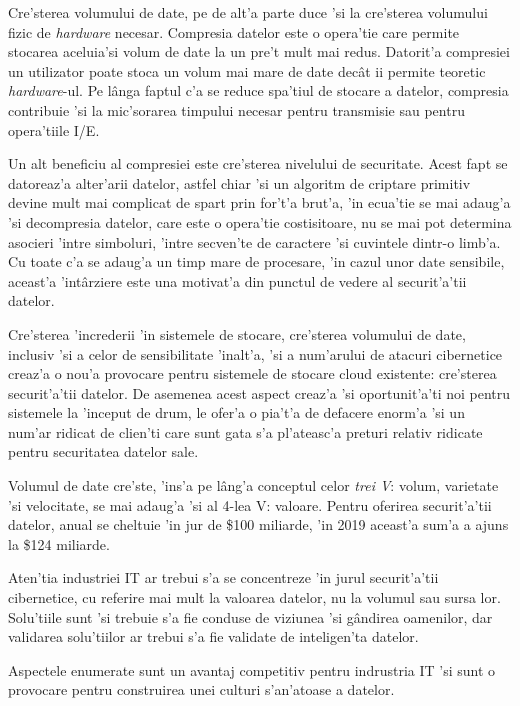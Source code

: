 \documentclass[12pt,a4paper,twoside]{report}
\begin{document}
Cre'sterea volumului de date, pe de alt'a parte duce 'si la cre'sterea volumului fizic de \textit{hardware} necesar. Compresia datelor este o opera'tie care permite stocarea aceluia'si volum de date la un pre't mult mai redus\cite{data_compression_ibm}. Datorit'a compresiei un utilizator poate stoca un volum mai mare de date decât ii permite teoretic \textit{hardware}-ul. Pe lânga faptul c'a se reduce spa'tiul de stocare a datelor, compresia contribuie 'si la mic'sorarea timpului necesar pentru transmisie sau pentru opera'tiile I/E\cite{compression_adv}. 

Un alt beneficiu al compresiei este cre'sterea nivelului de securitate. Acest fapt se datoreaz'a alter'arii datelor, astfel chiar 'si un algoritm de criptare primitiv devine mult mai complicat de spart prin for't'a brut'a, 'in ecua'tie se mai adaug'a 'si decompresia datelor, care este o opera'tie costisitoare, nu se mai pot determina asocieri 'intre simboluri, 'intre secven'te de caractere 'si cuvintele dintr-o limb'a. Cu toate c'a se adaug'a un timp mare de procesare, 'in cazul unor date sensibile, aceast'a 'intârziere este una motivat'a din punctul de vedere al securit'a'tii datelor.

Cre'sterea 'increderii 'in sistemele de stocare, cre'sterea volumului de date, inclusiv 'si a celor de sensibilitate 'inalt'a, 'si  a num'arului de atacuri cibernetice creaz'a o nou'a provocare pentru sistemele de stocare cloud existente: cre'sterea securit'a'tii datelor. De asemenea acest aspect creaz'a 'si oportunit'a'ti noi pentru sistemele la 'inceput de drum, le ofer'a o pia't'a de defacere enorm'a 'si un num'ar ridicat de clien'ti care sunt gata s'a pl'ateasc'a preturi relativ ridicate pentru securitatea datelor sale.

Volumul de date cre'ste, 'ins'a pe lâng'a conceptul celor \textit{trei V}: volum, varietate 'si velocitate, se mai adaug'a 'si al 4-lea V: valoare. Pentru oferirea securit'a'tii datelor, anual se cheltuie 'in jur de \$100 miliarde, 'in 2019 aceast'a sum'a a ajuns la \$124 miliarde.

Aten'tia industriei IT ar trebui s'a se concentreze 'in jurul securit'a'tii cibernetice, cu referire mai mult la valoarea datelor, nu la volumul sau sursa lor. Solu'tiile sunt 'si trebuie s'a fie conduse de viziunea 'si gândirea oamenilor, dar validarea solu'tiilor ar trebui s'a fie validate de inteligen'ta datelor. 
 
Aspectele enumerate sunt un avantaj competitiv pentru indrustria IT 'si sunt o provocare pentru construirea unei culturi s'an'atoase a datelor.
\end{document}
